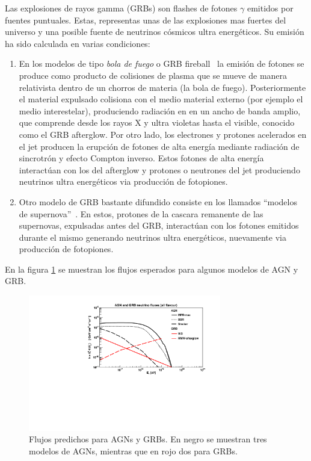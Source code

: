 	Las explosiones de rayos gamma (GRBs) son flashes de fotones $\gamma$ emitidos por fuentes puntuales.
	Estas, representas unas de las explosiones mas fuertes del universo y una posible fuente de neutrinos c\'osmicos ultra energ\'eticos.
	Su emisi\'on ha sido calculada en varias condiciones:
	\begin{enumerate}
	 \item En los modelos de tipo \emph{bola de fuego} o GRB fireball~\cite{cite:grb_Waxman1,cite:grb_Waxman2} la emisi\'on de fotones se produce como producto de colisiones de plasma que se mueve de manera relativista dentro de un chorros de materia (la bola de fuego).
	 Posteriormente el material expulsado colisiona con el medio material externo (por ejemplo el medio interestelar), produciendo radiaci\'on en en un ancho de banda amplio, que comprende desde los rayos X y ultra violetas hasta el visible, conocido como el GRB afterglow.
	 Por otro lado, los electrones y protones acelerados en el jet producen la erupci\'on de fotones de alta energ\'ia mediante radiaci\'on de sincrotr\'on y efecto Compton inverso.
	 Estos fotones de alta energ\'ia interact\'uan con los del afterglow y protones o neutrones del jet produciendo neutrinos ultra energ\'eticos via producci\'on de fotopiones.
	 \item Otro modelo de GRB bastante difundido consiste en los llamados ``modelos de supernova''~\cite{cite:grb_Supernova}. 
	 En estos, protones de la cascara remanente de las supernovas, expulsadas antes del GRB, interact\'uan con los fotones emitidos durante el mismo generando neutrinos ultra energ\'eticos, nuevamente via producci\'on de fotopiones.
	\end{enumerate}
	En la figura \ref{fig:flujosAGN} se muestran los flujos esperados para algunos modelos de AGN y GRB.
	\begin{figure}[ht]
		\begin{center}
		\includegraphics[width=0.75\textwidth]{fig/introduccion/AGN_GRB_nufluxes}
		\caption{\label{fig:flujosAGN} Flujos predichos para AGNs y GRBs. En negro se muestran tres modelos de AGNs\cite{cite:Mannheim1,cite:BBR,cite:SteckerAGN}, mientras que en rojo dos para GRBs\cite{cite:grb_Waxman2,cite:grb_Supernova}.}
		\end{center}
	\end{figure}
	
